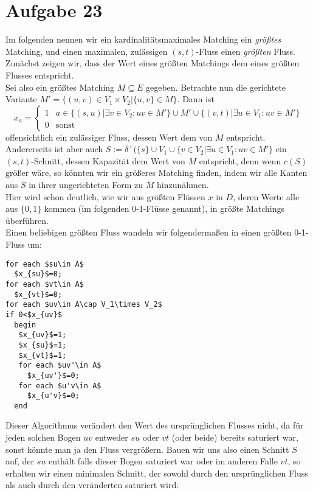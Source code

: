 \documentclass[a4paper,12pt,german]{scrartcl}
\begin{document}
\section*{Aufgabe 23}
Im folgenden nennen wir ein kardinalitätsmaximales Matching ein \emph{größtes} Matching, und einen maximalen, zulässigen $(s,t)$-Fluss einen \emph{größten} Fluss.\\
Zunächst zeigen wir, dass der Wert eines größten Matchings dem eines größten Flusses entspricht.\\
Sei also ein größtes Matching $M\subseteq E$ gegeben. Betrachte nun die gerichtete Variante $M'=\{(u,v)\in V_1\times V_2|\{u,v\}\in M\}$. Dann ist 
$$x_a=\begin{cases}1 &a\in \{(s,u)|\exists v\in V_2:uv\in M'\}\cup M'\cup \{(v,t)|\exists u\in V_1:uv\in M'\}\\
0&\text{sonst}\end{cases}$$
offensichtlich ein zulässiger Fluss, dessen Wert dem von $M$ entspricht.\\
Andererseits ist aber auch $S:=\delta^+(\{s\}\cup V_1\cup \{v\in V_2|\exists u\in V_1:uv\in M'\}$ ein $(s,t)$-Schnitt, dessen Kapazität dem Wert von $M$ entspricht, denn wenn $c(S)$ größer wäre, so könnten wir ein größeres Matching finden, indem wir alle Kanten aus $S$ in ihrer ungerichteten Form zu $M$ hinzunähmen.\\
Hier wird schon deutlich, wie wir aus größten Flüssen $x$ in $D$, deren Werte alle aus $\{0,1\}$ kommen (im folgenden 0-1-Flüsse genannt), in größte Matchings überführen.\\
Einen beliebigen größten Fluss wandeln wir folgendermaßen in einen größten 0-1-Fluss um:\\
\begin{lstlisting}[mathescape]
for each $su\in A$
  $x_{su}$=0;
for each $vt\in A$
  $x_{vt}$=0;
for each $uv\in A\cap V_1\times V_2$
if 0<$x_{uv}$
  begin
   $x_{uv}$=1;
   $x_{su}$=1;
   $x_{vt}$=1;
   for each $uv'\in A$
     $x_{uv'}$=0;
   for each $u'v\in A$
     $x_{u'v}$=0;  
  end
\end{lstlisting}
Dieser Algorithmus verändert den Wert des ursprünglichen Flusses nicht, da für jeden solchen Bogen $uv$ entweder $su$ oder $vt$ (oder beide) bereits saturiert war, sonst könnte man ja den Fluss vergrößern. Bauen wir uns also einen Schnitt $S$ auf, der $su$ enthält falls dieser Bogen saturiert war oder im anderen Falle $vt$, so erhalten wir einen minimalen Schnitt, der sowohl durch den ursprünglichen Fluss als auch durch den veränderten saturiert wird.
\end{document}
